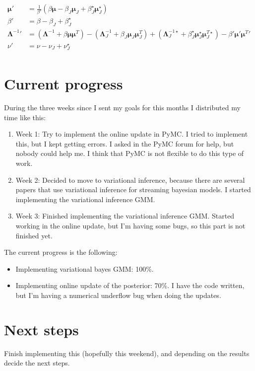 \documentclass{article}
\begin{document}
\begin{align}
\boldsymbol{\mu}' &= \frac{1}{\beta '}(\beta\boldsymbol{\mu} 
        - \beta_J\boldsymbol{\mu}_J 
        + \beta_J^{\star}\boldsymbol{\mu}_J^{\star}) \\
\beta' &= \beta - \beta_J + \beta_J^{\star} \\
\boldsymbol{\Lambda}^{-1}' &= 
    (\boldsymbol{\Lambda}^{-1} + \beta\boldsymbol{\mu}\boldsymbol{\mu}^T)
    - (\boldsymbol{\Lambda}_J^{-1} 
        + \beta_J\boldsymbol{\mu}_J\boldsymbol{\mu}_J^T)
    + (\boldsymbol{\Lambda}_J^{-1\star} 
        + \beta_J^{\star}\boldsymbol{\mu}_J^{\star}\boldsymbol{\mu}_J^{T\star})
    - \beta'\boldsymbol{\mu}'\boldsymbol{\mu}^T' \\
\nu' &= \nu - \nu_J + \nu_J^{\star} \\
\end{align}

\section{Current progress}

During the three weeks since I sent my goals for this months I distributed
my time like this:

\begin{enumerate}
\item Week 1: Try to implement the online update in PyMC. I tried to implement
this, but I kept getting errors. I asked in the PyMC forum for help, but nobody
could help me. I think that PyMC is not flexible to do this type of work.
\item Week 2: Decided to move to variational inference, because there are
several papers that use variational inference for streaming bayesian models.
I started implementing the variational inference GMM.
\item Week 3: Finished implementing the variational inference GMM. Started
working in the online update, but I'm having some bugs, so this part is 
not finished yet.
\end{enumerate}

The current progress is the following:

\begin{itemize}
\item Implementing variational bayes GMM: 100\%.
\item Implementing online update of the posterior: 70\%. I have the code written,
but I'm having a numerical underflow bug when doing the updates.
\end{itemize}

\section{Next steps}

Finish implementing this (hopefully this weekend), and depending on the results
decide the next steps.


 
\end{document}

